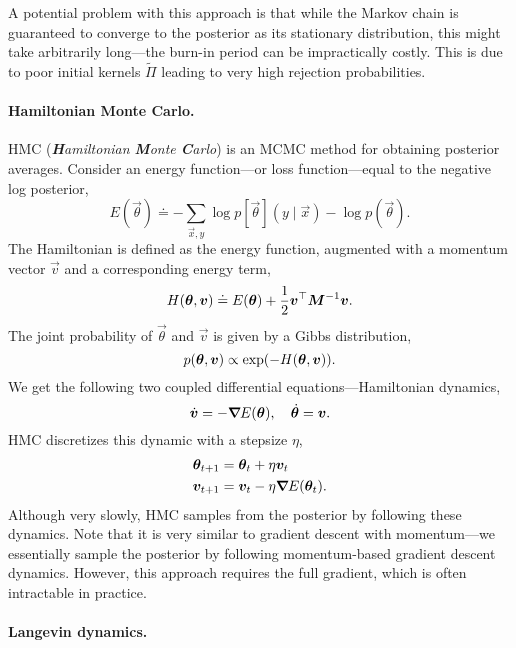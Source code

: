 A potential problem with this approach is that while the Markov chain is guaranteed to converge to
the posterior as its stationary distribution, this might take arbitrarily long---the burn-in period
can be impractically costly. This is due to poor initial kernels $\tilde{\Pi}$ leading to very high
rejection probabilities.

\paragraph{Hamiltonian Monte Carlo.}

HMC (\textit{\textbf{H}amiltonian \textbf{M}onte \textbf{C}arlo}) is an MCMC method for obtaining
posterior averages. Consider an energy function---or loss function---equal to the negative log
posterior, \[
    E(\vec{\theta}) \doteq -\sum_{\vec{x}, y} \log p[\vec{\theta}](y \mid \vec{x}) - \log p(\vec{\theta}).
\]
The Hamiltonian is defined as the energy function, augmented with a momentum vector $\vec{v}$ and a
corresponding energy term, \[
    H(\bm{\theta}, \bm{v}) \doteq E(\bm{\theta}) + \frac{1}{2} \bm{v}^\top\bm{M}^{-1} \bm{v}.
\]
The joint probability of $\vec{\theta}$ and $\vec{v}$ is given by a Gibbs distribution, \[
    p(\vec{\theta}, \vec{v}) \propto \exp \lft( -H(\vec{\theta}, \vec{v}) \rgt).
\]
We get the following two coupled differential equations---Hamiltonian dynamics, \[
    \dot{\bm{v}} = -\bm{\nabla}_{\! } E(\bm{\theta}), \quad \dot{\bm{\theta}} = \bm{v}.
\]
HMC discretizes this dynamic with a stepsize $\eta$,
\begin{align*}
    \bm{\theta}_{t+1} & = \bm{\theta}_t + \eta \bm{v}_t              \\
    \bm{v}_{t+1}      & = \bm{v}_t - \eta \bm{\nabla}_{\! } E(\bm{\theta}_t).
\end{align*}
Although very slowly, HMC samples from the posterior by following these dynamics. Note that it is
very similar to gradient descent with momentum---we essentially sample the posterior by following
momentum-based gradient descent dynamics. However, this approach requires the full
gradient, which is often intractable in practice.

\paragraph{Langevin dynamics.}


